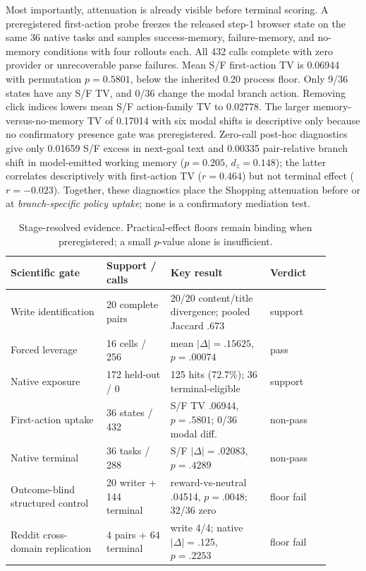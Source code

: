 Most importantly, attenuation is already visible before terminal scoring. A preregistered first-action probe freezes the released step-1 browser state on the same 36 native tasks and samples success-memory, failure-memory, and no-memory conditions with four rollouts each. All 432 calls complete with zero provider or unrecoverable parse failures. Mean S/F first-action TV is 0.06944 with permutation $p=0.5801$, below the inherited 0.20 process floor. Only 9/36 states have any S/F TV, and 0/36 change the modal branch action. Removing click indices lowers mean S/F action-family TV to 0.02778. The larger memory-versus-no-memory TV of 0.17014 with six modal shifts is descriptive only because no confirmatory presence gate was preregistered. Zero-call post-hoc diagnostics give only 0.01659 S/F excess in next-goal text and 0.00335 pair-relative branch shift in model-emitted working memory ($p=0.205$, $d_z=0.148$); the latter correlates descriptively with first-action TV ($r=0.464$) but not terminal effect ($r=-0.023$). Together, these diagnostics place the Shopping attenuation before or at \emph{branch-specific policy uptake}; none is a confirmatory mediation test.

\begin{table}[t]
\centering
\scriptsize
\caption{Stage-resolved evidence. Practical-effect floors remain binding when preregistered; a small $p$-value alone is insufficient.}
\label{tab:experiment-ladder}
\begin{tabular}{@{}p{0.27\linewidth}p{0.18\linewidth}p{0.28\linewidth}p{0.17\linewidth}@{}}
\toprule
Scientific gate & Support / calls & Key result & Verdict \\
\midrule
Write identification & 20 complete pairs & 20/20 content/title divergence; pooled Jaccard .673 & support \\
Forced leverage & 16 cells / 256 & mean $|\Delta|=.15625$, $p=.00074$ & pass \\
Native exposure & 172 held-out / 0 & 125 hits (72.7\%); 36 terminal-eligible & support \\
First-action uptake & 36 states / 432 & S/F TV .06944, $p=.5801$; 0/36 modal diff. & non-pass \\
Native terminal & 36 tasks / 288 & S/F $|\Delta|=.02083$, $p=.4289$ & non-pass \\
Outcome-blind structured control & 20 writer + 144 terminal & reward-vs-neutral .04514, $p=.0048$; 32/36 zero & floor fail \\
Reddit cross-domain replication & 4 pairs + 64 terminal & write 4/4; native $|\Delta|=.125$, $p=.2253$ & floor fail \\
\bottomrule
\end{tabular}
\end{table}

